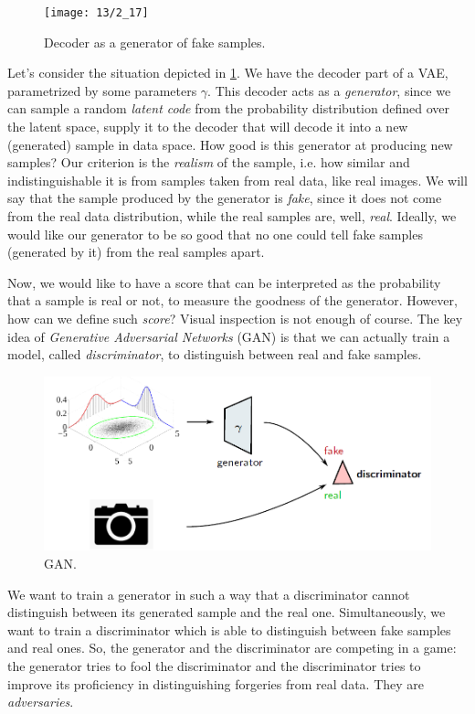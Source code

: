 

\begin{figure}[H]
	\centering
	\texttt{[image: 13/2\_17]}
	\caption{Decoder as a generator of fake samples.}\label{fig:13:1:gan}	
\end{figure}

Let's consider the situation depicted in \cref{fig:13:1:gan}. We have the decoder part of a VAE, parametrized by some parameters $\gamma$. This decoder acts as a \emph{generator}, since we can sample a random \emph{latent code} from the probability distribution defined over the latent space, supply it to the decoder that will decode it into a new (generated) sample in data space. How good is this generator at producing new samples? Our criterion is the \emph{realism} of the sample, i.e. how similar and indistinguishable it is from samples taken from real data, like real images. We will say that the sample produced by the generator is \emph{fake}, since it does not come from the real data distribution, while the real samples are, well, \emph{real}. Ideally, we would like our generator to be so good that no one could tell fake samples (generated by it) from the real samples apart.

Now, we would like to have a score that can be interpreted as the probability that a sample is real or not, to measure the goodness of the generator. However, how can we define such \emph{score}? Visual inspection is not enough of course. The key idea of \emph{Generative Adversarial Networks} (GAN) is that we can actually train a model, called \emph{discriminator}, to distinguish between real and fake samples.

\begin{figure}[H]
    \centering
    \includegraphics[width=.8\textwidth]{figures/13/gan-2.png}
    \caption{GAN.}
\end{figure}

We want to train a generator in such a way that a discriminator cannot distinguish between its generated sample and the real one. Simultaneously, we want to train a discriminator which is able to distinguish between fake samples and real ones. So, the generator and the discriminator are competing in a game: the generator tries to fool the discriminator and the discriminator tries to improve its proficiency in distinguishing forgeries from real data. They are \emph{adversaries}.

